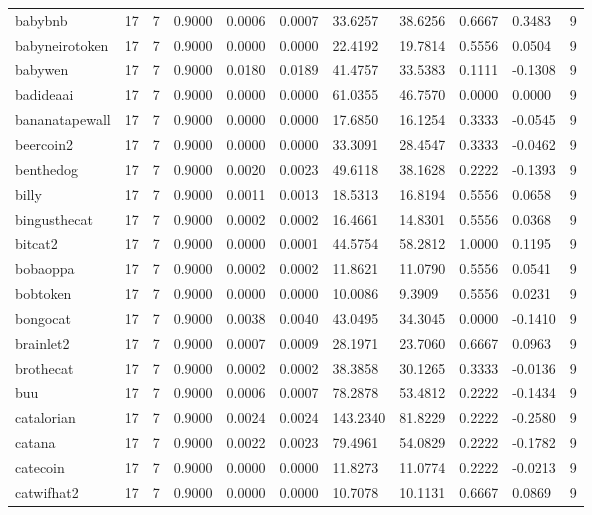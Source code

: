 \begin{table}[htbp]
\begin{tabular}{lllllllllll}
babybnb & 17 & 7 & 0.9000 & 0.0006 & 0.0007 & 33.6257 & 38.6256 & 0.6667 & 0.3483 & 9 \\
babyneirotoken & 17 & 7 & 0.9000 & 0.0000 & 0.0000 & 22.4192 & 19.7814 & 0.5556 & 0.0504 & 9 \\
babywen & 17 & 7 & 0.9000 & 0.0180 & 0.0189 & 41.4757 & 33.5383 & 0.1111 & -0.1308 & 9 \\
badideaai & 17 & 7 & 0.9000 & 0.0000 & 0.0000 & 61.0355 & 46.7570 & 0.0000 & 0.0000 & 9 \\
bananatapewall & 17 & 7 & 0.9000 & 0.0000 & 0.0000 & 17.6850 & 16.1254 & 0.3333 & -0.0545 & 9 \\
beercoin2 & 17 & 7 & 0.9000 & 0.0000 & 0.0000 & 33.3091 & 28.4547 & 0.3333 & -0.0462 & 9 \\
benthedog & 17 & 7 & 0.9000 & 0.0020 & 0.0023 & 49.6118 & 38.1628 & 0.2222 & -0.1393 & 9 \\
billy & 17 & 7 & 0.9000 & 0.0011 & 0.0013 & 18.5313 & 16.8194 & 0.5556 & 0.0658 & 9 \\
bingusthecat & 17 & 7 & 0.9000 & 0.0002 & 0.0002 & 16.4661 & 14.8301 & 0.5556 & 0.0368 & 9 \\
bitcat2 & 17 & 7 & 0.9000 & 0.0000 & 0.0001 & 44.5754 & 58.2812 & 1.0000 & 0.1195 & 9 \\
bobaoppa & 17 & 7 & 0.9000 & 0.0002 & 0.0002 & 11.8621 & 11.0790 & 0.5556 & 0.0541 & 9 \\
bobtoken & 17 & 7 & 0.9000 & 0.0000 & 0.0000 & 10.0086 & 9.3909 & 0.5556 & 0.0231 & 9 \\
bongocat & 17 & 7 & 0.9000 & 0.0038 & 0.0040 & 43.0495 & 34.3045 & 0.0000 & -0.1410 & 9 \\
brainlet2 & 17 & 7 & 0.9000 & 0.0007 & 0.0009 & 28.1971 & 23.7060 & 0.6667 & 0.0963 & 9 \\
brothecat & 17 & 7 & 0.9000 & 0.0002 & 0.0002 & 38.3858 & 30.1265 & 0.3333 & -0.0136 & 9 \\
buu & 17 & 7 & 0.9000 & 0.0006 & 0.0007 & 78.2878 & 53.4812 & 0.2222 & -0.1434 & 9 \\
catalorian & 17 & 7 & 0.9000 & 0.0024 & 0.0024 & 143.2340 & 81.8229 & 0.2222 & -0.2580 & 9 \\
catana & 17 & 7 & 0.9000 & 0.0022 & 0.0023 & 79.4961 & 54.0829 & 0.2222 & -0.1782 & 9 \\
catecoin & 17 & 7 & 0.9000 & 0.0000 & 0.0000 & 11.8273 & 11.0774 & 0.2222 & -0.0213 & 9 \\
catwifhat2 & 17 & 7 & 0.9000 & 0.0000 & 0.0000 & 10.7078 & 10.1131 & 0.6667 & 0.0869 & 9 \\

\end{tabular}
\end{table}
